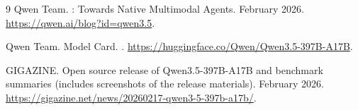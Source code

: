 \documentclass[11pt]{article}
\begin{document}
\begin{thebibliography}{9}
Qwen Team.
: Towards Native Multimodal Agents.
\newblock February 2026.
\newblock \url{https://qwen.ai/blog?id=qwen3.5}.

Qwen Team.
 Model Card.
.
\newblock \url{https://huggingface.co/Qwen/Qwen3.5-397B-A17B}.

GIGAZINE.
\newblock Open source release of {Qwen3.5-397B-A17B} and benchmark summaries (includes screenshots of the release materials).
\newblock February 2026.
\newblock \url{https://gigazine.net/news/20260217-qwen3-5-397b-a17b/}.

\end{thebibliography}
\end{document}
